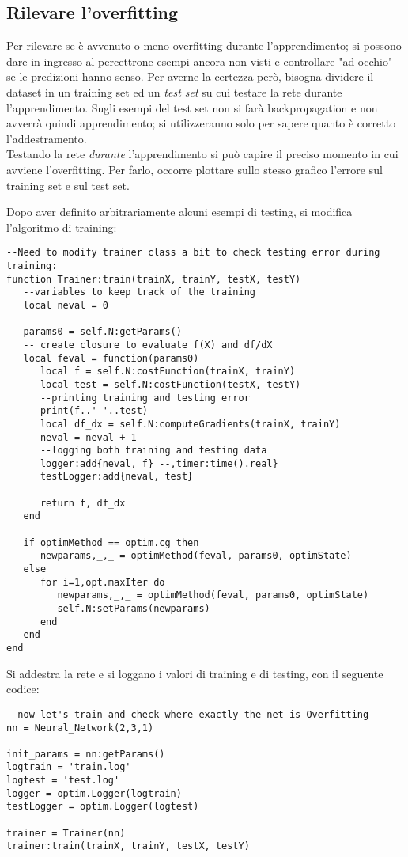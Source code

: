 \subsection{Rilevare l'overfitting}
Per rilevare se è avvenuto o meno overfitting durante l'apprendimento; si possono dare in ingresso al percettrone esempi ancora non visti e controllare "ad occhio" se le predizioni hanno senso. Per averne la certezza però, bisogna dividere il dataset in un training set ed un \emph{test set} su cui testare la rete durante l'apprendimento. Sugli esempi del test set non si farà backpropagation e non avverrà quindi apprendimento; si utilizzeranno solo per sapere quanto è corretto l'addestramento. \\
Testando la rete \emph{durante} l'apprendimento si può capire il preciso momento in cui avviene l'overfitting. Per farlo, occorre plottare sullo stesso grafico l'errore sul training set e sul test set. 

Dopo aver definito arbitrariamente alcuni esempi di testing, si modifica l'algoritmo di training: 
\begin{lstlisting}[language={[5.2]Lua}]
--Need to modify trainer class a bit to check testing error during training:
function Trainer:train(trainX, trainY, testX, testY)
   --variables to keep track of the training
   local neval = 0

   params0 = self.N:getParams()
   -- create closure to evaluate f(X) and df/dX
   local feval = function(params0)
      local f = self.N:costFunction(trainX, trainY)
      local test = self.N:costFunction(testX, testY)
      --printing training and testing error
      print(f..' '..test)
      local df_dx = self.N:computeGradients(trainX, trainY)
      neval = neval + 1
      --logging both training and testing data
      logger:add{neval, f} --,timer:time().real}
      testLogger:add{neval, test}

      return f, df_dx
   end

   if optimMethod == optim.cg then
      newparams,_,_ = optimMethod(feval, params0, optimState)
   else
      for i=1,opt.maxIter do
         newparams,_,_ = optimMethod(feval, params0, optimState)
         self.N:setParams(newparams)
      end
   end
end
\end{lstlisting}

Si addestra la rete e si loggano i valori di training e di testing, con il seguente codice: 
\begin{lstlisting}[language={[5.2]Lua}]
--now let's train and check where exactly the net is Overfitting
nn = Neural_Network(2,3,1)

init_params = nn:getParams()
logtrain = 'train.log'
logtest = 'test.log'
logger = optim.Logger(logtrain)
testLogger = optim.Logger(logtest)

trainer = Trainer(nn)
trainer:train(trainX, trainY, testX, testY)
\end{lstlisting}

